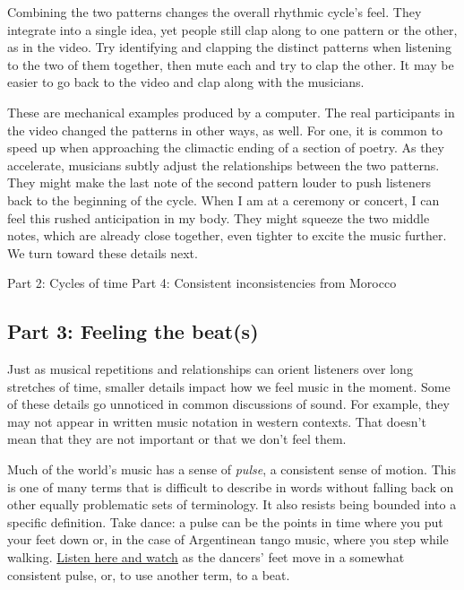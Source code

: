 \documentclass[twoside]{article}
\begin{document}
\hypertarget{example7}{}

Combining the two patterns changes the overall rhythmic cycle's feel.
They integrate into a single idea, yet people still clap along to one
pattern or the other, as in the video. Try identifying and clapping the
distinct patterns when listening to the two of them together, then mute
each and try to clap the other. It may be easier to go back to the video
and clap along with the musicians.

\hypertarget{example8}{}

These are mechanical examples produced by a computer. The real
participants in the video changed the patterns in other ways, as well.
For one, it is common to speed up when approaching the climactic ending
of a section of poetry. As they accelerate, musicians subtly adjust the
relationships between the two patterns. They might make the last note of
the second pattern louder to push listeners back to the beginning of the
cycle. When I am at a ceremony or concert, I can feel this rushed
anticipation in my body. They might squeeze the two middle notes, which
are already close together, even tighter to excite the music further. We
turn toward these details next.

Part 2: Cycles of time Part 4: Consistent inconsistencies from Morocco

\hypertarget{part-3-feeling-the-beats}{%
\subsection{Part 3: Feeling the
beat(s)}\label{part-3-feeling-the-beats}}

Just as musical repetitions and relationships can orient listeners over
long stretches of time, smaller details impact how we feel music in the
moment. Some of these details go unnoticed in common discussions of
sound. For example, they may not appear in written music notation in
western contexts. That doesn't mean that they are not important or that
we don't feel them.

Much of the world's music has a sense of \emph{pulse}, a consistent
sense of motion. This is one of many terms that is difficult to describe
in words without falling back on other equally problematic sets of
terminology. It also resists being bounded into a specific definition.
Take dance: a pulse can be the points in time where you put your feet
down or, in the case of Argentinean tango music, where you step while
walking. \href{https://www.youtube.com/embed/wIvfPI_GT3U}{Listen here
and watch} as the dancers' feet move in a somewhat consistent pulse, or,
to use another term, to a beat.
\end{document}
